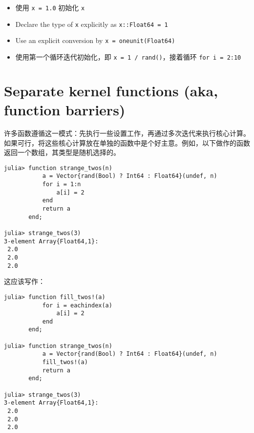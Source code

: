 \begin{itemize}
\item 使用 \texttt{x = 1.0} 初始化 \texttt{x}


\item Declare the type of \texttt{x} explicitly as \texttt{x::Float64 = 1}


\item Use an explicit conversion by \texttt{x = oneunit(Float64)}


\item 使用第一个循环迭代初始化，即 \texttt{x = 1 / rand()}，接着循环 \texttt{for i = 2:10}

\end{itemize}


\hypertarget{16258602729394793584}{}


\section{Separate kernel functions (aka, function barriers)}



许多函数遵循这一模式：先执行一些设置工作，再通过多次迭代来执行核心计算。如果可行，将这些核心计算放在单独的函数中是个好主意。例如，以下做作的函数返回一个数组，其类型是随机选择的。




\begin{verbatim}
julia> function strange_twos(n)
           a = Vector{rand(Bool) ? Int64 : Float64}(undef, n)
           for i = 1:n
               a[i] = 2
           end
           return a
       end;

julia> strange_twos(3)
3-element Array{Float64,1}:
 2.0
 2.0
 2.0
\end{verbatim}



这应该写作：




\begin{verbatim}
julia> function fill_twos!(a)
           for i = eachindex(a)
               a[i] = 2
           end
       end;

julia> function strange_twos(n)
           a = Vector{rand(Bool) ? Int64 : Float64}(undef, n)
           fill_twos!(a)
           return a
       end;

julia> strange_twos(3)
3-element Array{Float64,1}:
 2.0
 2.0
 2.0
\end{verbatim}




